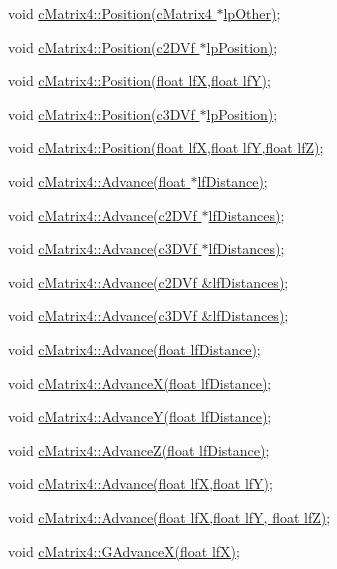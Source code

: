  void \hyperlink{classc_matrix4_a6e0051199566d89193d7c2e07e957eb4}{cMatrix4::Position(cMatrix4 $\ast$lpOther)}; \par
 void \hyperlink{classc_matrix4_ac182a447e047d9071b035b374e8abf45}{cMatrix4::Position(c2DVf $\ast$lpPosition)}; \par
 void \hyperlink{classc_matrix4_a81cd364d37dc5eae6f968551331ad7a3}{cMatrix4::Position(float lfX,float lfY)}; \par
 void \hyperlink{classc_matrix4_a8a49976693c27e4fbb5fce427eb6bcf5}{cMatrix4::Position(c3DVf $\ast$lpPosition)}; \par
 void \hyperlink{classc_matrix4_ae404d9b94cb676d9896385fef1eda422}{cMatrix4::Position(float lfX,float lfY,float lfZ)};\par
 \par
 void \hyperlink{classc_matrix4_a91f9e8d79d7721ba35f59c754a5507d1}{cMatrix4::Advance(float $\ast$lfDistance)}; \par
 void \hyperlink{classc_matrix4_a6c53b28448e2d2531a19cd49955f5901}{cMatrix4::Advance(c2DVf $\ast$lfDistances)}; \par
 void \hyperlink{classc_matrix4_a86aefa3a444eaabd4ad1a66e4857f40e}{cMatrix4::Advance(c3DVf $\ast$lfDistances)}; \par
 void \hyperlink{classc_matrix4_a07d410e6592dacf244ad118d70443181}{cMatrix4::Advance(c2DVf \&lfDistances)}; \par
 void \hyperlink{classc_matrix4_ac07dd71793d6df522efa2098f9e1daa6}{cMatrix4::Advance(c3DVf \&lfDistances)}; \par
 void \hyperlink{classc_matrix4_ad0744229e75d1053c3a2e4bcfe8dc46f}{cMatrix4::Advance(float lfDistance)}; \par
 void \hyperlink{classc_matrix4_aa23f7d55e4eddcba673f8a6e44f63c3e}{cMatrix4::AdvanceX(float lfDistance)}; \par
 void \hyperlink{classc_matrix4_ae28d0f2cfe996ec5422cdaec98f30c9a}{cMatrix4::AdvanceY(float lfDistance)}; \par
 void \hyperlink{classc_matrix4_a31d0d26e3b91628365871ad10dc33f8e}{cMatrix4::AdvanceZ(float lfDistance)}; \par
 void \hyperlink{classc_matrix4_ab956ec27a465b889126632475fd7d703}{cMatrix4::Advance(float lfX,float lfY)}; \par
 void \hyperlink{classc_matrix4_a00d27c2daab0e05c403c8fb86445fb81}{cMatrix4::Advance(float lfX,float lfY, float lfZ)}; \par
 void \hyperlink{classc_matrix4_a6796b615c465903d48fe0c8094b1f7c1}{cMatrix4::GAdvanceX(float lfX)}; \par
